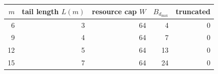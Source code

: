 \begin{tabular}{r r r r r}%
\hline%
$m$&\textbf{tail length $L(m)$}&\textbf{resource cap $W$}&\textbf{$B_{d_{\max}}$}&\textbf{truncated}\\%
\hline%
6&3&64&4&0\\%
9&4&64&7&0\\%
12&5&64&13&0\\%
15&7&64&24&0\\%
\hline%
\end{tabular}
